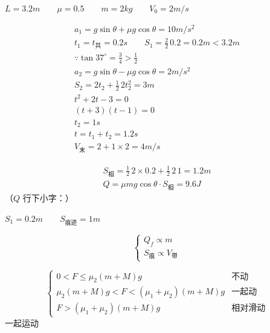 \begin{problem}
$L=3.2\unit{m}$　　$\mu=0.5$　　$m=2\unit{kg}$　　$V_0=2\unit{m/s}$


\begin{solution}
\begin{gather*}
a_1=g\sin\theta+\mu g\cos\theta=10\unit{m/s^2}\\
t_1=t_{\text{共}}=0.2\unit{s}\qquad S_1=\frac{2}{2}\,0.2=0.2\unit{m}<3.2\unit{m}\\ %
\because\tan37^\circ=\frac34>\frac12\\ %
a_2=g\sin\theta-\mu g\cos\theta=2\unit{m/s^2}\\
S_2=2t_2+\frac12\,2t_2^2=3\unit{m}\\
t^2+2t-3=0\\
(t+3)(t-1)=0\\
t_2=1\unit{s}\\
t=t_1+t_2=1.2\unit{s}\\
V_{\text{末}}=2+1\times2=4\unit{m/s}
\end{gather*}


\begin{gather*}
S_{\text{相}}=\frac12\,2\times0.2+\frac12\,2\,1=1.2\unit{m}\\
Q=\mu mg\cos\theta\cdot S_{\text{相}}=9.6\unit{J}
\end{gather*}
（$Q$ 行下小字：）
\end{solution}


$S_1=0.2\unit{m}$　　$S_{\text{痕迹}}=1\unit{m}$

\[
\left\{\begin{array}{l}
Q_f\propto m\\
S_{\text{痕}}\propto V_{\text{带}}
\end{array}\right.
\] %
\end{problem}

\[
\left\{\begin{array}{ll}
0<F\le\mu_2(m+M)g & \text{不动}\\
\mu_2(m+M)g<F<(\mu_1+\mu_2)(m+M)g & \text{一起动}\\
F>(\mu_1+\mu_2)(m+M)g & \text{相对滑动}
\end{array}\right.
\]
一起运动

